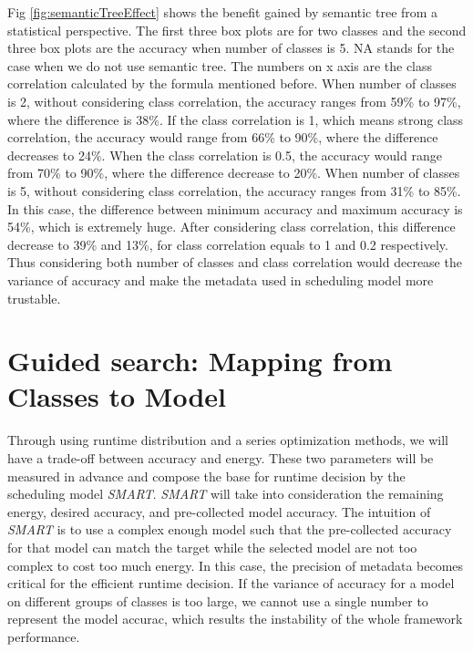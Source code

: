 \documentclass[conference]{IEEEtran}
\begin{document}
\begin{spacing}{0.9}
Fig \ref{fig:semanticTreeEffect} shows the benefit gained by semantic tree from a statistical perspective. The first three box plots are for two classes and the second three box plots are the accuracy when number of classes is 5. NA stands for the case when we do not use semantic tree. The numbers on x axis are the class correlation calculated by the formula mentioned before. When number of classes is 2, without considering class correlation, the accuracy ranges from 59\% to 97\%, where the difference is 38\%. If the class correlation is 1, which means strong class correlation, the accuracy would range from 66\% to 90\%, where the difference decreases to 24\%. When the class correlation is 0.5, the accuracy would range from 70\% to 90\%, where the difference decrease to 20\%. When number of classes is 5, without considering class correlation, the accuracy ranges from 31\% to 85\%. In this case, the difference between minimum accuracy and maximum accuracy is 54\%, which is extremely huge. After considering class correlation, this difference decrease to 39\% and 13\%, for class correlation equals to 1 and 0.2 respectively. Thus considering both number of classes and class correlation would decrease the variance of accuracy and make the metadata used in scheduling model more trustable.

\section{Guided search: Mapping from Classes to Model}
Through using runtime distribution and a series optimization methods, we will have a trade-off between accuracy and energy. These two parameters will be measured in advance and compose the base for runtime decision by the scheduling model \textit{SMART}. \textit{SMART} will take into consideration the remaining energy, desired accuracy, and pre-collected model accuracy. The intuition of \textit{SMART} is to use a complex enough model such that the pre-collected accuracy for that model can match the target while the selected model are not too complex to cost too much energy. In this case, the precision of metadata becomes critical for the efficient runtime decision. If the variance of accuracy for a model on different groups of classes is too large, we cannot use a single number to represent the model accurac, which results the instability of the whole framework performance.


\end{spacing}
\end{document}
